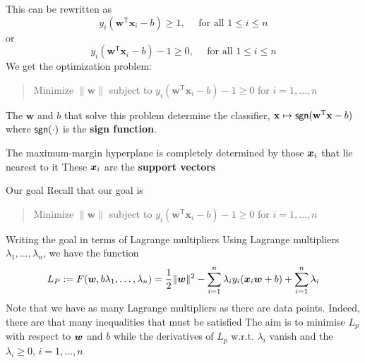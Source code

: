 \documentclass[aspectratio=169]{beamer}\usepackage[]{graphicx}\usepackage[]{xcolor}
\begin{document}
\begin{frame}
    This can be rewritten as
    \[
        y_i(\mathbf{w}^\mathsf{T} \mathbf{x}_i - b) \ge 1, \quad \text{ for all } 1 \le i \le n
    \]
    or
    \[
        y_i(\mathbf{w}^\mathsf{T} \mathbf{x}_i - b)-1\geq 0, \quad \text{ for all } 1 \le i \le n
    \]
    \vfill
    We get the optimization problem:
    \begin{quote}
        Minimize $\|\mathbf{w}\|$ subject to $y_i(\mathbf{w}^\mathsf{T} \mathbf{x}_i - b)-1 \ge 0$ for $i = 1, \ldots, n$
    \end{quote}
    \vfill
    The $\mathbf{w}$ and $b$ that solve this problem determine the classifier, $\mathbf{x} \mapsto \mathsf{sgn}(\mathbf{w}^\mathsf{T} \mathbf{x} - b)$ where $\mathsf{sgn}(\cdot)$ is the \textbf{sign function}.
\end{frame}

\begin{frame}   
    The maximum-margin hyperplane is completely determined by those $\bm{x}_i$ that lie nearest to it
    \vfill
    These $\bm{x}_i$ are the \textbf{support vectors}
\end{frame}





\begin{frame}{Our goal}
    Recall that our goal is
    \vfill
    \begin{quote}
        Minimize $\|\mathbf{w}\|$ subject to $y_i(\mathbf{w}^\mathsf{T} \mathbf{x}_i - b)-1 \ge 0$ for $i = 1, \ldots, n$
    \end{quote}
\end{frame}    


\begin{frame}{Writing the goal in terms of Lagrange multipliers}
    Using Lagrange multipliers $\lambda_1,\ldots,\lambda_n$, we have the function
    \[
        L_P:=F(\bm{w},b\lambda_1,\ldots,\lambda_n) =
        \frac 12\|\bm{w}\|^2 -\sum_{i=1}^n \lambda_iy_i(\bm{x}_i\bm{w}+b)
        +\sum_{i=1}^n\lambda_i
    \]
    \vfill
    Note that we have as many Lagrange multipliers as there are data points. Indeed, there are that many inequalities that must be satisfied
    \vfill 
    The aim is to minimise $L_p$ with respect to $\bm{w}$ and $b$ while the derivatives of $L_p$ w.r.t. $\lambda_i$ vanish and the $\lambda_i\geq 0$, $i=1,\ldots,n$
\end{frame}
\end{document}
